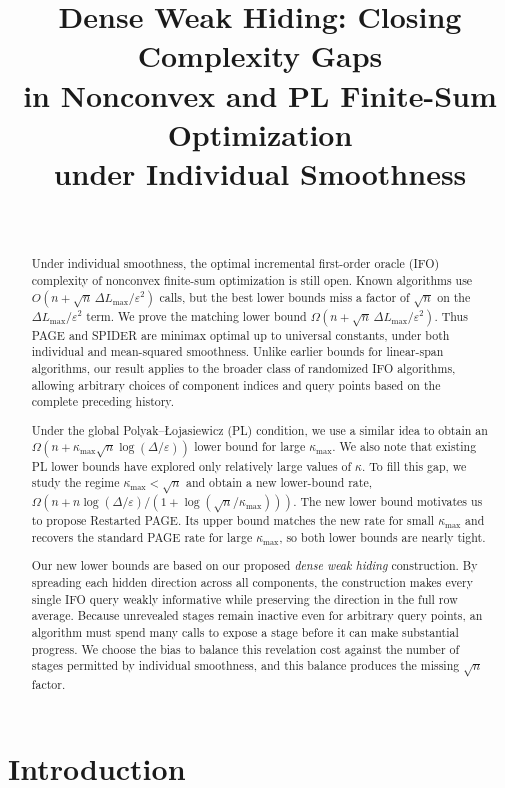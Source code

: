 \documentclass{article}
\title{Dense Weak Hiding: Closing Complexity Gaps\\
in Nonconvex and PL Finite-Sum Optimization\\
under Individual Smoothness}
\author{%
  \PaperAuthors\\[5pt]
  \normalfont\small \PaperAffiliations
}
\theoremstyle{definition}
\begin{document}
\raggedbottom
\maketitle
\fancyhead{}
\renewcommand{\headrulewidth}{0pt}

\begin{abstract}
Under individual smoothness, the optimal incremental first-order oracle (IFO)
complexity of nonconvex finite-sum optimization is still open.  Known
algorithms use $O(n+\sqrt n\,\Delta L_{\max}/\varepsilon^2)$ calls, but the
best lower bounds miss a factor of $\sqrt n$ on the
$\Delta L_{\max}/\varepsilon^2$ term.  We prove the matching lower bound
$\Omega(n+\sqrt n\,\Delta L_{\max}/\varepsilon^2)$.
Thus PAGE and SPIDER are minimax optimal up to universal constants, under both
individual and mean-squared smoothness.
Unlike earlier bounds for linear-span algorithms, our result applies to the
broader class of randomized IFO algorithms, allowing arbitrary choices of
component indices and query points based on the complete preceding history.

Under the global Polyak--\L{}ojasiewicz (PL) condition, we use a similar idea
to obtain an $\Omega(n+\kappa_{\max}\sqrt n\log(\Delta/\varepsilon))$ lower bound for
large $\kappa_{\max}$.  We also
note that existing PL lower bounds have explored only relatively large values
of $\kappa$.  To fill this gap, we study the regime
$\kappa_{\max}<\sqrt n$ and obtain a new lower-bound rate,
$\Omega\!\left(n+n\log(\Delta/\varepsilon)/(1+\log(\sqrt n/\kappa_{\max}))\right)$.
The new lower bound motivates us to propose Restarted PAGE.  Its upper bound
matches the new rate for small $\kappa_{\max}$ and recovers the standard PAGE
rate for large $\kappa_{\max}$, so both lower bounds are nearly tight.

Our new lower bounds are based on our proposed \emph{dense weak hiding}
construction.  By spreading each hidden direction across all components, the
construction makes every single IFO query weakly informative while preserving
the direction in the full row average.  Because unrevealed stages remain
inactive even for arbitrary query points, an algorithm must spend many calls
to expose a stage before it can make substantial progress.  We choose the bias
to balance this revelation cost against the number of stages permitted by
individual smoothness, and this balance produces the missing $\sqrt n$ factor.
\end{abstract}


\section{Introduction}
\end{document}
